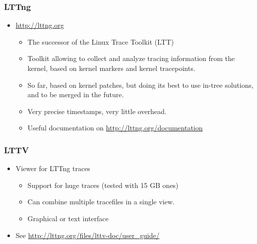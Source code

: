\begin{frame}
  \frametitle{LTTng}
  \begin{itemize}
  \item \url{http://lttng.org}
    \begin{itemize}
    \item The successor of the Linux Trace Toolkit (LTT)
    \item Toolkit allowing to collect and analyze tracing information
      from the kernel, based on kernel markers and kernel tracepoints.
    \item So far, based on kernel patches, but doing its best to use
      in-tree solutions, and to be merged in the future.
    \item Very precise timestamps, very little overhead.
    \item Useful documentation on \url{http://lttng.org/documentation}
    \end{itemize}
  \end{itemize}
\end{frame}

\begin{frame}
  \frametitle{LTTV}
  \begin{itemize}
  \item Viewer for LTTng traces
    \begin{itemize}
    \item Support for huge traces (tested with 15 GB ones)
    \item Can combine multiple tracefiles in a single view.
    \item Graphical or text interface
    \end{itemize}
    \item See \url{http://lttng.org/files/lttv-doc/user_guide/}
  \end{itemize}
\end{frame}
